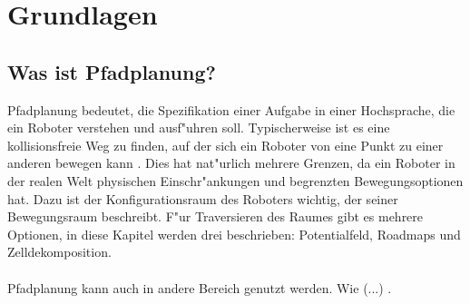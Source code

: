\chapter{Grundlagen}

\section{Was ist Pfadplanung?}
Pfadplanung bedeutet, die Spezifikation einer Aufgabe in einer Hochsprache, die ein Roboter verstehen und ausf"uhren soll. Typischerweise ist es eine kollisionsfreie Weg zu finden, auf der sich ein Roboter von eine Punkt zu einer anderen bewegen kann \cite[~S. 1]{Principles:05}. Dies hat nat"urlich mehrere Grenzen, da ein Roboter in der realen Welt physischen Einschr"ankungen und begrenzten Bewegungsoptionen hat. Dazu ist der Konfigurationsraum des Roboters wichtig, der seiner Bewegungsraum beschreibt. F"ur Traversieren des Raumes gibt es mehrere Optionen, in diese Kapitel werden drei beschrieben: Potentialfeld, Roadmaps und Zelldekomposition.
\\\\
Pfadplanung kann auch in andere Bereich genutzt werden. Wie (...) . 

